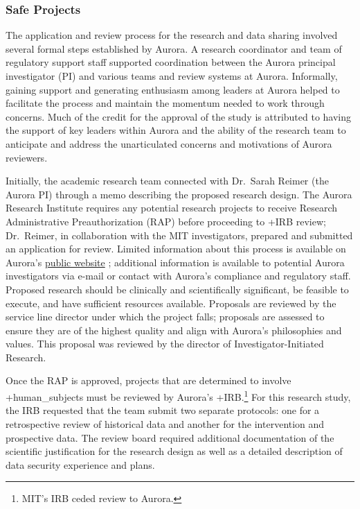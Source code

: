 \documentclass[
]{WileySix}
\begin{document}
\hypertarget{safe-projects-4}{%
\subsubsection{Safe Projects}\label{safe-projects-4}}

The application and review process for the research and data sharing involved several formal steps established by Aurora. A research coordinator and team of regulatory support staff supported coordination between the Aurora principal investigator (PI) and various teams and review systems at Aurora. Informally, gaining support and generating enthusiasm among leaders at Aurora helped to facilitate the process and maintain the momentum needed to work through concerns. Much of the credit for the approval of the study is attributed to having the support of key leaders within Aurora and the ability of the research team to anticipate and address the unarticulated concerns and motivations of Aurora reviewers.

Initially, the academic research team connected with Dr.~Sarah Reimer (the Aurora PI) through a memo describing the proposed research design. The Aurora Research Institute requires any potential research projects to receive Research Administrative Preauthorization (RAP) before proceeding to +IRB\textbar{} review; Dr.~Reimer, in collaboration with the MIT investigators, prepared and submitted an application for review. Limited information about this process is available on Aurora's \href{https://www.aurorahealthcare.org/aurora-research-institute/researcher-resources/research-administrative-preauthorization\#Overview}{public website} \citep{aurorahealthcare}; additional information is available to potential Aurora investigators via e-mail or contact with Aurora's compliance and regulatory staff. Proposed research should be clinically and scientifically significant, be feasible to execute, and have sufficient resources available. Proposals are reviewed by the service line director under which the project falls; proposals are assessed to ensure they are of the highest quality and align with Aurora's philosophies and values. This proposal was reviewed by the director of Investigator-Initiated Research.

Once the RAP is approved, projects that are determined to involve +human\_subjects\textbar{} must be reviewed by Aurora's +IRB\textbar.\footnote{MIT's IRB ceded review to Aurora.} For this research study, the IRB requested that the team submit two separate protocols: one for a retrospective review of historical data and another for the intervention and prospective data. The review board required additional documentation of the scientific justification for the research design as well as a detailed description of data security experience and plans.
\end{document}
